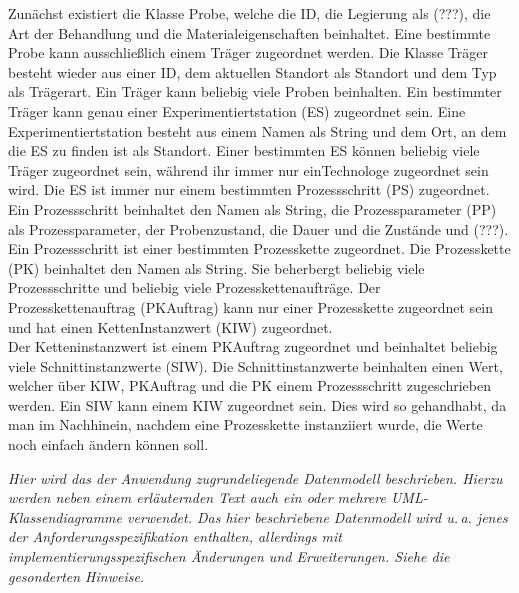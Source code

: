 \documentclass[enabledeprecatedfontcommands,fontsize=12pt,paper=a4,twoside]{scrartcl}
\begin{document}
{  Zunächst existiert die Klasse Probe, welche die ID, die Legierung als (???), die Art der Behandlung und die Materialeigenschaften beinhaltet. Eine bestimmte Probe kann ausschließlich einem Träger zugeordnet werden.
Die Klasse Träger besteht wieder aus einer ID, dem aktuellen Standort als  Standort und dem Typ als Trägerart. Ein Träger kann beliebig viele Proben beinhalten. Ein bestimmter Träger kann genau einer Experimentiertstation (ES) zugeordnet sein. Eine Experimentiertstation besteht aus einem Namen als String und dem Ort, an dem die ES zu finden ist als Standort. Einer bestimmten ES können beliebig viele Träger zugeordnet sein, während ihr immer nur einTechnologe zugeordnet sein wird. Die ES ist immer nur einem bestimmten Prozessschritt (PS) zugeordnet. Ein Prozessschritt beinhaltet den Namen als String, die Prozessparameter (PP) als Prozessparameter, der Probenzustand, die Dauer und die Zustände und (???). Ein Prozessschritt ist einer bestimmten Prozesskette zugeordnet. Die Prozesskette (PK) beinhaltet den Namen als String. Sie beherbergt beliebig viele Prozessschritte und beliebig viele Prozesskettenaufträge. Der  Prozesskettenauftrag (PKAuftrag) kann nur einer Prozesskette zugeordnet sein und hat einen KettenInstanzwert (KIW) zugeordnet. \\


Der Ketteninstanzwert ist einem PKAuftrag zugeordnet und beinhaltet beliebig viele Schnittinstanzwerte (SIW). Die Schnittinstanzwerte beinhalten einen Wert, welcher über KIW, PKAuftrag und die PK einem Prozessschritt zugeschrieben werden. Ein SIW kann einem KIW zugeordnet sein. 
Dies wird so gehandhabt, da man im Nachhinein, nachdem eine Prozesskette instanziiert wurde, die Werte noch einfach ändern können soll.
}

{\it Hier wird das der Anwendung zugrundeliegende Datenmodell
  beschrieben. Hierzu werden neben einem erläuternden Text auch ein
  oder mehrere {UML}-Klassendiagramme verwendet. Das hier beschriebene
  Datenmodell wird u.\,a. jenes der Anforderungsspezifikation enthalten,
  allerdings mit implementierungsspezifischen Änderungen und
  Erweiterungen. Siehe die gesonderten Hinweise.}
   
\end{document}
